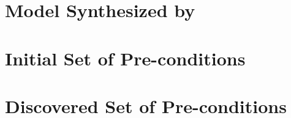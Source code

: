 

\section{{\Alloy} Model Synthesized by {\Cartier}}
\label{appendix:mainmodel}




\section{Initial Set of Pre-conditions}
\label{appendix:initialPrecondition}



\section{Discovered Set of Pre-conditions}
\label{appendix:discoveredPrecondition}


